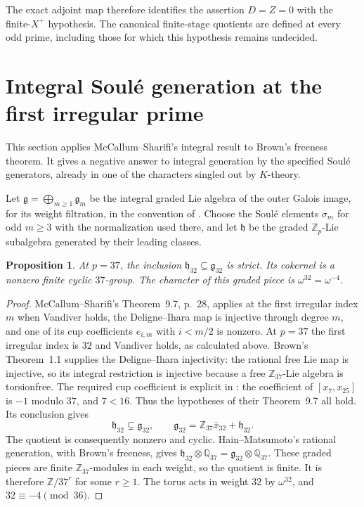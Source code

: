 \documentclass[11pt]{article}
\newtheorem{proposition}[theorem]{Proposition}
\theoremstyle{definition}\newtheorem{definition}[theorem]{Definition}
\newcommand{\Z}{\mathbb Z}\newcommand{\Q}{\mathbb Q}
\begin{document}
The exact adjoint map therefore identifies the assertion
$D=Z=0$ with the finite-$X^+$ hypothesis. The canonical
finite-stage quotients are defined at every odd prime,
including those for which this hypothesis remains undecided.

\section{Integral Soul\'e generation at the first irregular prime}
\label{sec:integral}

This section applies McCallum--Sharifi's integral result to Brown's
freeness theorem. It gives a negative answer to integral generation
by the specified Soul\'e generators, already in one of the
characters singled out by $K$-theory.

Let $\mathfrak g=\bigoplus_{m\geq1}\mathfrak g_m$ be the
integral graded Lie algebra of the outer Galois image, for its
weight filtration, in the convention of
\cite[\S9, pp.~24--28]{MS}. Choose the Soul\'e elements
$\sigma_m$ for odd $m\geq3$ with the normalization used there,
and let $\mathfrak h$ be the graded $\Z_p$-Lie subalgebra
generated by their leading classes.

\begin{proposition}\label{prop:integral37}
At $p=37$, the inclusion $\mathfrak h_{32}\subseteq
\mathfrak g_{32}$ is strict. Its cokernel is a nonzero finite
cyclic $37$-group. The character of this graded piece is
$\omega^{32}=\omega^{-4}$.
\end{proposition}
\begin{proof}
McCallum--Sharifi's Theorem~9.7, p.~28, applies at the first
irregular index $m$ when Vandiver holds, the Deligne--Ihara
map is injective through degree $m$, and one of its cup
coefficients $e_{i,m}$ with $i<m/2$ is nonzero.
At $p=37$ the first irregular index is $32$ and Vandiver
holds, as calculated above. Brown's Theorem~1.1 supplies
the Deligne--Ihara injectivity: the rational free Lie map
is injective, so its integral restriction is injective
because a free $\Z_{37}$-Lie algebra is torsionfree.
The required cup coefficient is explicit in
\cite[Corollary~8.3, p.~23]{MS}: the coefficient of
$[x_7,x_{25}]$ is $-1$ modulo $37$, and $7<16$.
Thus the hypotheses of their Theorem~9.7 all hold.
Its conclusion gives
\[
 \mathfrak h_{32}\varsubsetneq\mathfrak g_{32},
 \qquad
 \mathfrak g_{32}=\Z_{37}\bar x_{32}+\mathfrak h_{32}.
\]
The quotient is consequently nonzero and cyclic.
Hain--Matsumoto's rational generation, with Brown's
freeness, gives
$\mathfrak h_{32}\otimes\Q_{37}
 =\mathfrak g_{32}\otimes\Q_{37}$.
These graded pieces are finite $\Z_{37}$-modules in
each weight, so the quotient is finite. It is therefore
$\Z/37^r$ for some $r\geq1$.
The torus acts in weight $32$ by $\omega^{32}$, and
$32\equiv-4\pmod{36}$.
\end{proof}
\end{document}
